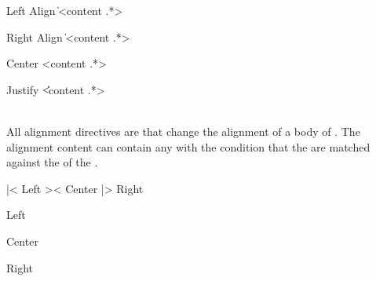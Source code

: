 \begin{identifier}{Left Align}
  \|\<<content .*>
\end{identifier}
\begin{identifier}{Right Align}
  \|\><content .*>
\end{identifier}
\begin{identifier}{Center}
  \>\<<content .*>
\end{identifier}
\begin{identifier}{Justify}
  \|\|<content .*>
\end{identifier}
 \\

All alignment directives are  that change the alignment of a body of . The alignment content can contain any  with the condition that the  are matched against the  of the . \\

\begin{examples}
  \begin{examplesource}
    |< Left
    >< Center
    |> Right
  \end{examplesource}
  \begin{exampleoutput}
    \begin{minipage}{0.5\textwidth}
      \begin{flushleft}Left\end{flushleft}
      \begin{center}Center\end{center}
      \begin{flushright}Right\end{flushright}
    \end{minipage}
  \end{exampleoutput}
\end{examples}

